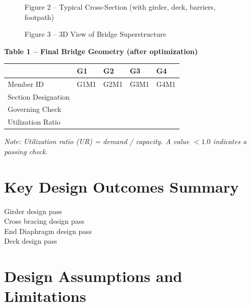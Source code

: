\documentclass[12pt,a4paper]{report}
\numberwithin{table}{chapter}
\numberwithin{figure}{chapter}
\begin{document}
\begin{figure}[H]
\centering
{}
\caption*{Figure 2 -- Typical Cross-Section (with girder, deck, barriers, footpath)}
\end{figure}

\begin{figure}[H]
\centering
{}
\caption*{Figure 3 -- 3D View of Bridge Superstructure}
\end{figure}

\noindent\textbf{Table 1 -- Final Bridge Geometry (after optimization)}

\vspace{0.4em}
\noindent
\begin{tabular}{|C{2.8cm}|C{3.0cm}|C{3.0cm}|C{3.0cm}|C{3.0cm}|}
\hline
  \textbf{} &
  \textbf{G1} &
  \textbf{G2} &
  \textbf{G3} &
  \textbf{G4} \\
\hline
Member ID & G1M1 & G2M1 & G3M1 & G4M1 \\
\hline
Section Designation &  &  &  &  \\
\hline
Governing Check &  &  &  &  \\
\hline
Utilization Ratio &  &  &  &  \\
\hline
\end{tabular}

\vspace{0.4em}
\noindent\textit{Note: Utilization ratio (UR) = demand / capacity. A value $< 1.0$ indicates a passing check.}

\vspace{1em}

\section*{Key Design Outcomes Summary}
\label{sec:key-outcomes}

\noindent Girder design pass \\
Cross bracing design pass \\
End Diaphragm design pass \\
Deck design pass

\section*{Design Assumptions and Limitations}
\label{sec:assumptions}
\end{document}
